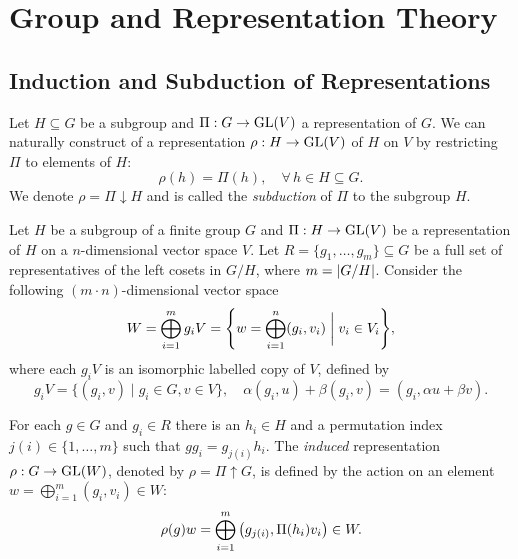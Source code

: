 \documentclass[12pt]{report}
\begin{document}
\section{Group and Representation Theory} \label{sec:grouptheory}

\subsection{Induction and Subduction of Representations} \label{subsec:induction_subduction}

\begin{definition} \label{def:subduction_defi}
Let $H \subseteq G$ be a subgroup and $\Pi: G \to {\text{GL}}(V)$ a representation of $G$. We can naturally construct of a representation $\rho: H \to {\text{GL}}(V)$ of $H$ on $V$ by restricting $\Pi$ to elements of $H$:
\begin{equation} \label{eq:subduction_defi}
\rho(h) = \Pi(h), \quad \forall \, h \in H \subseteq G.
\end{equation}
We denote $\rho = \Pi \downarrow H$ and is called the \textit{subduction} of $\Pi$ to the subgroup $H$.
\end{definition}


\begin{definition} \label{def:induction_defi}
Let $H$ be a subgroup of a finite group $G$ and $\Pi: H \to {\text{GL}}(V)$ be a representation of $H$ on a $n$-dimensional vector space $V$. Let $R = \{g_1, \ldots, g_m\} \subseteq G$ be a full set of representatives of the left cosets in $G/H$, where $m = \abs{G/H}$. Consider the following $(m\cdot n)$-dimensional vector space
\begin{equation} \label{eq:W_vectorspace_induction_copies}
W = \bigoplus_{i=1}^m g_i V = \qty{w = \bigoplus_{i=1}^n (g_i, v_i) \;\bigg|\; v_i \in V_i},
\end{equation}
where each $g_i V$ is an isomorphic labelled copy of $V$, defined by
\begin{equation} \label{eq:giV_vectorspace_labelled_copy}
g_i V = \{ (g_i, v) \mid g_i \in G, v \in V\}, \quad
\alpha (g_i, u) + \beta (g_i, v) = (g_i, \alpha u + \beta v).
\end{equation}

For each $g \in G$ and $g_i \in R$ there is an $h_i \in H$ and a permutation index $j(i) \in \{1, \ldots, m\}$ such that $g g_i = g_{j(i)} h_i$. The \textit{induced} representation $\rho: G \to {\text{GL}}(W)$, denoted by $\rho = \Pi \uparrow G$, is defined by the action on an element $w = \bigoplus_{i=1}^{m} (g_i, v_i) \in W$:
\begin{equation} \label{eq:induced_rep_action_defi}
\rho(g) w = \bigoplus_{i=1}^{m} \qty(g_{j(i)}, \Pi(h_i) v_i) \in W.
\end{equation}
\end{definition}
\end{document}
